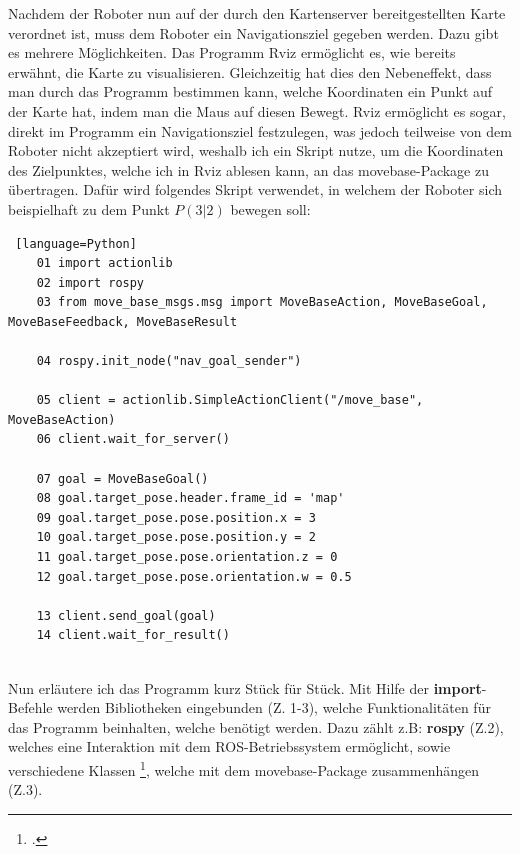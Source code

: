 {{{			 Nachdem der Roboter nun auf der durch den Kartenserver bereitgestellten Karte verordnet ist, muss dem Roboter ein Navigationsziel gegeben werden.
			 Dazu gibt es mehrere Möglichkeiten. Das Programm Rviz ermöglicht es, wie bereits erwähnt, die Karte zu visualisieren. Gleichzeitig hat dies den Nebeneffekt, dass man durch das Programm bestimmen kann, welche Koordinaten ein Punkt auf der Karte hat, indem man die Maus auf diesen Bewegt. Rviz ermöglicht es sogar, direkt im Programm ein Navigationsziel festzulegen, was jedoch teilweise von dem Roboter nicht akzeptiert wird, weshalb ich ein Skript nutze, um die Koordinaten des Zielpunktes, welche ich in Rviz ablesen kann, an das move\textunderscore base-Package zu übertragen.
			 Dafür wird folgendes Skript verwendet, in welchem der Roboter sich beispielhaft zu dem Punkt $P(3|2)$ bewegen soll:
			 \newline  %
			
			\lstset{
				breaklines = true,
				frame = single,
				numbers = none
			}
\begin{lstlisting} [language=Python]
	01 import actionlib
	02 import rospy
	03 from move_base_msgs.msg import MoveBaseAction, MoveBaseGoal,   MoveBaseFeedback, MoveBaseResult
			 	
	04 rospy.init_node("nav_goal_sender")
			 	
	05 client = actionlib.SimpleActionClient("/move_base", MoveBaseAction)
	06 client.wait_for_server()
			 	
	07 goal = MoveBaseGoal()
	08 goal.target_pose.header.frame_id = 'map' 
	09 goal.target_pose.pose.position.x = 3
	10 goal.target_pose.pose.position.y = 2
	11 goal.target_pose.pose.orientation.z = 0
	12 goal.target_pose.pose.orientation.w = 0.5
			 	
	13 client.send_goal(goal)
	14 client.wait_for_result()
			 	
\end{lstlisting}
		 	Nun erläutere ich das Programm kurz Stück für Stück.
		 	Mit Hilfe der \textbf{import}-Befehle werden Bibliotheken eingebunden (Z. 1-3), welche Funktionalitäten für das Programm beinhalten, welche benötigt werden. Dazu zählt z.B: \textbf{rospy} (Z.2), welches eine Interaktion mit dem ROS-Betriebssystem ermöglicht, sowie verschiedene Klassen  \footcite{Programmierung: Ansammmlung von Funktionen (eines Aufgabenbereiches)}, welche mit dem move\textunderscore base-Package zusammenhängen (Z.3).
		 	
}}}
